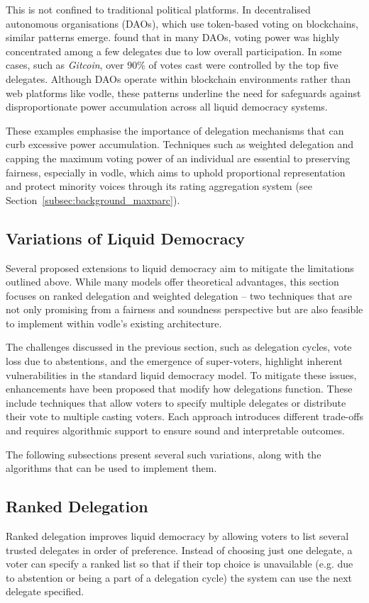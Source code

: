 This is not confined to traditional political platforms. In decentralised autonomous organisations (DAOs), which use token-based voting on blockchains, similar patterns emerge. \citet{hallWhatHappensWhen2024} found that in many DAOs, voting power was highly concentrated among a few delegates due to low overall participation. In some cases, such as \textit{Gitcoin}, over 90\% of votes cast were controlled by the top five delegates. Although DAOs operate within blockchain environments rather than web platforms like vodle, these patterns underline the need for safeguards against disproportionate power accumulation across all liquid democracy systems.

These examples emphasise the importance of delegation mechanisms that can curb excessive power accumulation. Techniques such as weighted delegation and capping the maximum voting power of an individual are essential to preserving fairness, especially in vodle, which aims to uphold proportional representation and protect minority voices through its rating aggregation system (see Section~\ref{subsec:background_maxparc}).

\subsection{Variations of Liquid Democracy}
Several proposed extensions to liquid democracy aim to mitigate the limitations outlined above. While many models offer theoretical advantages, this section focuses on ranked delegation and weighted delegation -- two techniques that are not only promising from a fairness and soundness perspective but are also feasible to implement within vodle's existing architecture.

The challenges discussed in the previous section, such as delegation cycles, vote loss due to abstentions, and the emergence of super-voters, highlight inherent vulnerabilities in the standard liquid democracy model. To mitigate these issues, enhancements have been proposed that modify how delegations function. These include techniques that allow voters to specify multiple delegates or distribute their vote to multiple casting voters. Each approach introduces different trade-offs and requires algorithmic support to ensure sound and interpretable outcomes.

The following subsections present several such variations, along with the algorithms that can be used to implement them.
\subsection*{Ranked Delegation}\label{subsec:background_ranked_delegation}
Ranked delegation improves liquid democracy by allowing voters to list several trusted delegates in order of preference. Instead of choosing just one delegate, a voter can specify a ranked list so that if their top choice is unavailable (e.g. due to abstention or being a part of a delegation cycle) the system can use the next delegate specified.

